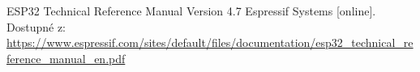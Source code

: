 \sloppy
\begin{thebibliography}{9}

ESP32 Technical Reference Manual Version 4.7 Espressif Systems [online]. Dostupné z:
\href{https://www.espressif.com/sites/default/files/documentation/esp32_technical_reference_manual_en.pdf}{https://www.espressif.com/sites/default/files/documentation/esp32_technical_reference_manual_en.pdf}


\end{thebibliography}